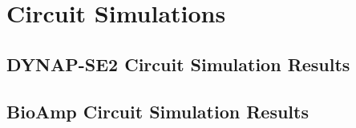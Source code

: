 \chapter{Circuit Simulations}
\label{chapter:csim}
\section{DYNAP-SE2 Circuit Simulation Results}
\section{BioAmp Circuit Simulation Results}
